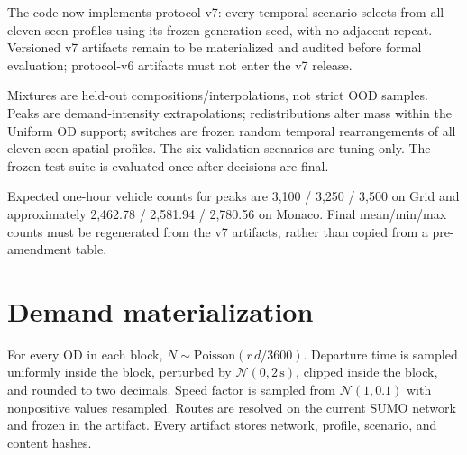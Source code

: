 The code now implements protocol v7: every temporal scenario selects from all eleven seen profiles using its frozen generation seed, with no adjacent repeat. Versioned v7 artifacts remain to be materialized and audited before formal evaluation; protocol-v6 artifacts must not enter the v7 release.

Mixtures are held-out compositions/interpolations, not strict OOD samples. Peaks are demand-intensity extrapolations; redistributions alter mass within the Uniform OD support; switches are frozen random temporal rearrangements of all eleven seen spatial profiles. The six validation scenarios are tuning-only. The frozen test suite is evaluated once after decisions are final.

Expected one-hour vehicle counts for peaks are 3,100 / 3,250 / 3,500 on Grid and approximately 2,462.78 / 2,581.94 / 2,780.56 on Monaco. Final mean/min/max counts must be regenerated from the v7 artifacts, rather than copied from a pre-amendment table.

\section{Demand materialization}
For every OD in each block, $N\sim\mathrm{Poisson}(r\,d/3600)$. Departure time is sampled uniformly inside the block, perturbed by $\mathcal{N}(0,2\,\mathrm{s})$, clipped inside the block, and rounded to two decimals. Speed factor is sampled from $\mathcal{N}(1,0.1)$ with nonpositive values resampled. Routes are resolved on the current SUMO network and frozen in the artifact. Every artifact stores network, profile, scenario, and content hashes.
